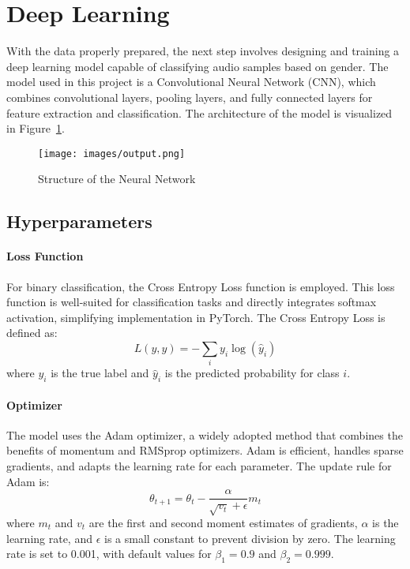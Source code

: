 \section{Deep Learning}
\label{sec:deepLearning}

With the data properly prepared, the next step involves designing and training a deep learning model capable of classifying audio samples based on gender. The model used in this project is a Convolutional Neural Network (CNN), which combines convolutional layers, pooling layers, and fully connected layers for feature extraction and classification. The architecture of the model is visualized in Figure~\ref{fig:neuralNetwork}.

\begin{figure}[h]
    \centering
    \texttt{[image: images/output.png]}
    \caption{Structure of the Neural Network}
    \label{fig:neuralNetwork}
\end{figure}

\subsection{Hyperparameters}

\paragraph{Loss Function}
For binary classification, the Cross Entropy Loss function is employed. This loss function is well-suited for classification tasks and directly integrates softmax activation, simplifying implementation in PyTorch. The Cross Entropy Loss is defined as:
\begin{equation}
    L(y, \hat{y}) = -\sum_{i} y_i \log(\hat{y}_i)
\end{equation}
where \(y_i\) is the true label and \(\hat{y}_i\) is the predicted probability for class \(i\).

\paragraph{Optimizer}
The model uses the Adam optimizer, a widely adopted method that combines the benefits of momentum and RMSprop optimizers. Adam is efficient, handles sparse gradients, and adapts the learning rate for each parameter. The update rule for Adam is:
\begin{equation}
    \theta_{t+1} = \theta_t - \frac{\alpha}{\sqrt{v_t} + \epsilon} m_t
\end{equation}
where \(m_t\) and \(v_t\) are the first and second moment estimates of gradients, \(\alpha\) is the learning rate, and \(\epsilon\) is a small constant to prevent division by zero. The learning rate is set to 0.001, with default values for \(\beta_1 = 0.9\) and \(\beta_2 = 0.999\).

